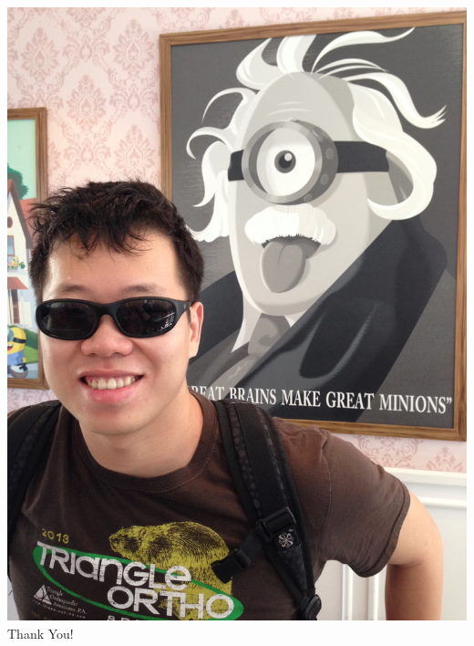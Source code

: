 \documentclass[xcolor=dvipsnames]{beamer}
\begin{document}
	\begin{frame}
		\begin{center}
			\includegraphics[scale=0.05]{me.jpg}\\
			\huge{Thank You!}
		\end{center}
	\end{frame}
\end{document}
